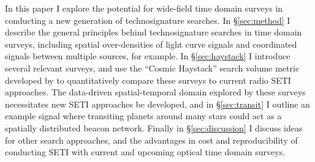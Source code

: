 \documentclass[twocolumn]{aastex62}
\begin{document}
In this paper I explore the potential for wide-field time domain surveys in conducting a new generation of technosignature searches. 
In \S\ref{sec:method} I describe the general principles behind technosignature searches in time domain surveys, including spatial over-densities of light curve signals and coordinated signals between multiple sources, for example.
In \S\ref{sec:haystack} I introduce several relevant surveys, and use the ``Cosmic Haystack'' search volume metric developed by \citet{wright2018c} to quantitatively compare these surveys to current radio SETI approaches. 
The data-driven spatial-temporal domain explored by these surveys necessitates new SETI approaches be developed, and in \S\ref{sec:transit} I outline an example signal where transiting planets around many stars could act as a spatially distributed beacon network.
Finally in \S\ref{sec:discussion} I discuss ideas for other search approaches, and the advantages in cost and reproducibility of conducting SETI with current and upcoming optical time domain surveys.

\end{document}
